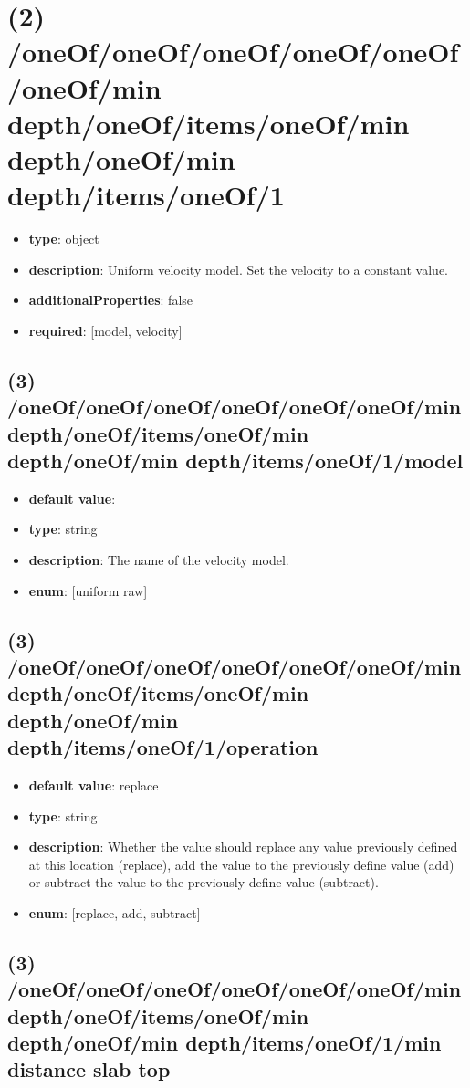 \section{(2) /oneOf/oneOf/oneOf/oneOf/oneOf/oneOf/min depth/oneOf/items/oneOf/min depth/oneOf/min depth/items/oneOf/1}
\begin{itemize}[leftmargin=2em]\item {\bf type}: object
\item {\bf description}: Uniform velocity model. Set the velocity to a constant value.
\item {\bf additionalProperties}: false
\item {\bf required}: [model, velocity]\end{itemize}
\subsection{(3) /oneOf/oneOf/oneOf/oneOf/oneOf/oneOf/min depth/oneOf/items/oneOf/min depth/oneOf/min depth/items/oneOf/1/model}
\begin{itemize}[leftmargin=3em]\item {\bf default value}: 
\item {\bf type}: string
\item {\bf description}: The name of the velocity model.
\item {\bf enum}: [uniform raw]\end{itemize}\subsection{(3) /oneOf/oneOf/oneOf/oneOf/oneOf/oneOf/min depth/oneOf/items/oneOf/min depth/oneOf/min depth/items/oneOf/1/operation}
\begin{itemize}[leftmargin=3em]\item {\bf default value}: replace
\item {\bf type}: string
\item {\bf description}: Whether the value should replace any value previously defined at this location (replace), add the value to the previously define value (add) or subtract the value to the previously define value (subtract).
\item {\bf enum}: [replace, add, subtract]\end{itemize}\subsection{(3) /oneOf/oneOf/oneOf/oneOf/oneOf/oneOf/min depth/oneOf/items/oneOf/min depth/oneOf/min depth/items/oneOf/1/min distance slab top}
